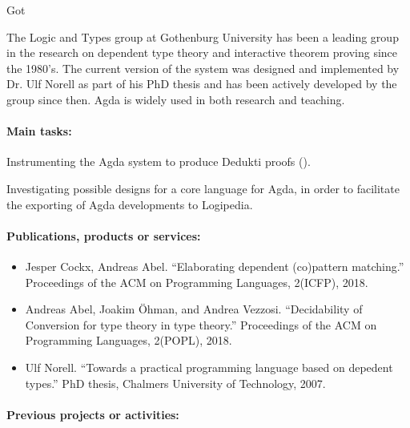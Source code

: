 \begin{sitedescription}{Got}

The Logic and Types group at Gothenburg University has been a leading group
in the research on dependent type theory and interactive theorem proving
since the 1980's. The current version of the system was designed and
implemented by Dr. Ulf Norell as part of his PhD thesis and has been
actively developed by the group since then. Agda is widely used in both
research and teaching.

\paragraph*{Main tasks:}

\begin{compactitem}
\item Instrumenting the Agda system to produce Dedukti proofs
  ().
\item Investigating possible designs for a core language for Agda, in
  order to facilitate the exporting of Agda developments to Logipedia.
\end{compactitem}

\paragraph*{Publications, products or services:}
\begin{itemize}
  \item Jesper Cockx, Andreas Abel. ``Elaborating dependent
  (co)pattern matching.'' Proceedings of the ACM on Programming
  Languages, 2(ICFP), 2018.
  \item Andreas Abel, Joakim \"Ohman, and Andrea Vezzosi. ``Decidability of
  Conversion for type theory in type theory.'' Proceedings of the ACM on Programming
  Languages, 2(POPL), 2018.
  \item Ulf Norell. ``Towards a practical programming language based on
  depedent types.'' PhD thesis, Chalmers University of Technology, 2007.
\end{itemize}

\paragraph*{Previous projects or activities:}


\end{sitedescription}
